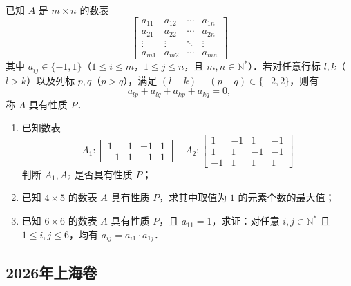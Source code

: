\begin{description}
\begin{enumerate}[leftmargin=5pt]
        已知 $A$ 是 $m\times n$ 的数表
        \[
        \begin{bmatrix}
        a_{11}&a_{12}&\cdots&a_{1n}\\
        a_{21}&a_{22}&\cdots&a_{2n}\\
        \vdots&\vdots&\ddots&\vdots\\
        a_{m1}&a_{m2}&\cdots&a_{mn}
        \end{bmatrix}
        \]
        其中 $a_{ij}\in\{-1,1\}$（$1\leqslant i\leqslant m$，$1\leqslant j\leqslant n$，且 $m,n\in\mathbb{N}^*$）．若对任意行标 $l,k$（$l>k$）以及列标 $p,q$（$p>q$），满足 $(l-k)-(p-q)\in\{-2,2\}$，则有
        \[
        a_{lp}+a_{lq}+a_{kp}+a_{kq}=0,
        \]
        称 $A$ 具有性质 $P$．

        \begin{enumerate}[label=(\arabic*)]
            \item 已知数表
            \[
            A_1:\begin{bmatrix}1&1&-1&1\\ -1&1&-1&1\end{bmatrix}\quad
            A_2:\begin{bmatrix}1&-1&1&-1\\ 1&1&-1&-1\\ -1&1&1&1\end{bmatrix}
            \]
            判断 $A_1,A_2$ 是否具有性质 $P$；
            \item 已知 $4\times5$ 的数表 $A$ 具有性质 $P$，求其中取值为 $1$ 的元素个数的最大值；
            \item 已知 $6\times6$ 的数表 $A$ 具有性质 $P$，且 $a_{11}=1$，求证：对任意 $i,j\in\mathbb{N}^*$ 且 $1\leqslant i,j\leqslant6$，均有 $a_{ij}=a_{i1}\cdot a_{1j}$．
        \end{enumerate}
    \end{enumerate}
\end{description}
\clearpage



\subsection{2026年上海卷}\label{gk:2026年上海卷}

